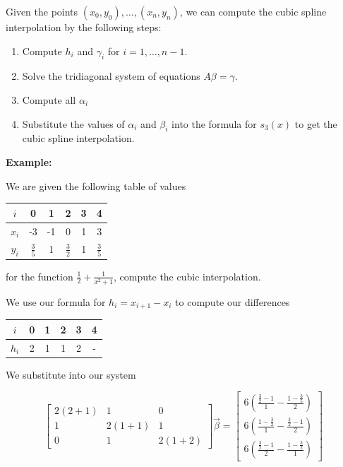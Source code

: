 Given the points \((x_0, y_0), \dots, (x_n, y_n)\), we can compute the cubic spline interpolation by the following steps:

\begin{enumerate}

    \item Compute \(h_i\) and \(\gamma_i\) for \(i = 1, \dots, n - 1\).

    \item Solve the tridiagonal system of equations \(A\beta = \gamma\).

    \item Compute all \(\alpha_i\)

    \item Substitute the values of \(\alpha_i\) and \(\beta_i\) into the formula for \(s_3(x)\) to get the cubic spline interpolation.

\end{enumerate}

\textbf{Example:}

We are given the following table of values 

\begin{center}
\begin{tabular}{c|c|c|c|c|c}
    \(i\)   & 0 & 1 & 2 & 3 & 4\\ \hline
    \(x_i\) & -3 & -1 & 0 & 1 & 3 \\ 
    \(y_i\) & \(\frac{3}{5}\) & 1 & \(\frac{3}{2}\) & 1 & \(\frac{3}{5}\)
\end{tabular}
\end{center}

for the function \(\frac{1}{2} + \frac{1}{x^2 + 1}\), compute the cubic interpolation.

We use our formula for \(h_i = x_{i + 1} - x_{i}\) to compute our differences 

\begin{center}
\begin{tabular}{c|c|c|c|c|c}
    \(i\)   & 0 & 1 & 2 & 3 & 4\\ \hline
    \(h_i\) & 2 & 1 & 1 & 2 & -
\end{tabular}
\end{center}

We substitute into our system 

\[
    \begin{bmatrix}
        2(2 + 1) & 1 & 0 \\ 
        1 & 2(1 + 1) & 1 \\ 
        0 & 1 & 2(1 + 2)
    \end{bmatrix}
    \vec{\beta}
    = 
    \begin{bmatrix}
        6\left(\frac{\frac{3}{2} - 1}{1} - \frac{1 - \frac{3}{5}}{2}\right) \\ 
        6\left(\frac{1 - \frac{3}{2}}{1} - \frac{\frac{3}{2} - 1}{2}\right) \\ 
        6\left(\frac{\frac{3}{2} - 1}{2} - \frac{1 - \frac{3}{2}}{1}\right) 
    \end{bmatrix}
\]


